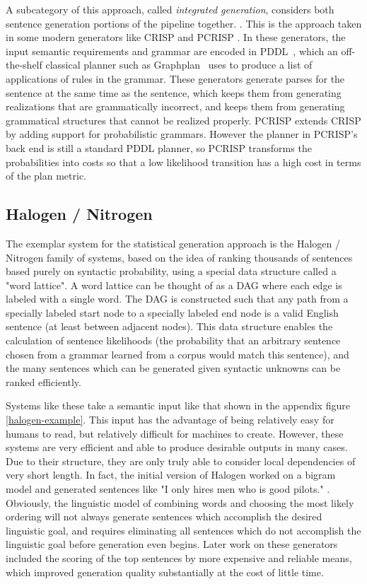 A subcategory of this approach, called {\em integrated generation}, considers both
sentence generation portions of the pipeline together.
\cite{koller_sentence_2007}.  This is the approach taken in some
modern generators like CRISP \cite{koller_sentence_2007} and PCRISP
\cite{bauer_sentence_2010}.  In these generators, the input semantic
requirements and grammar are encoded in PDDL~\cite{fox2003pddl2},
which an off-the-shelf classical planner such as
Graphplan~\cite{blum_1997_graphplan} uses to produce a list of
applications of rules in the grammar.  These generators generate
parses for the sentence at the same time as the sentence, which keeps
them from generating realizations that are grammatically incorrect,
and keeps them from generating grammatical structures that cannot be
realized properly. PCRISP extends CRISP by adding support for
probabilistic grammars. However the planner in PCRISP's back end is
still a standard PDDL planner, so PCRISP transforms the probabilities
into costs so that a low likelihood transition has a high cost in
terms of the plan metric.

\subsection{Halogen / Nitrogen}

The exemplar system for the statistical generation approach is the
Halogen / Nitrogen family of systems, based on the idea of
ranking thousands of sentences based purely on syntactic probability,
using a special data structure called a "word lattice".
A word lattice can be thought of as a DAG where each edge is
labeled with a single word.  The DAG is constructed such that
any path from a specially labeled start node to a specially labeled
end node is a valid English sentence (at least between adjacent nodes).
This data structure enables the calculation of sentence likelihoods
(the probability that an arbitrary sentence chosen from a grammar
learned from a corpus would match this sentence), and the many
sentences which can be generated
given syntactic unknowns can be ranked efficiently.

Systems like these take a semantic input like that shown in
the appendix figure \ref{halogen-example}.  This input
has the advantage of being relatively easy for humans to
read, but relatively difficult for machines to create.
However, these systems are very efficient and able
to produce desirable outputs in many cases.  Due to
their structure, they are only truly able to consider local
dependencies of very short length.  In fact, the
initial version of Halogen worked on a bigram model
and generated sentences like "I only hires men who is good 
pilots." \cite{knight_1995_genselect}.  Obviously, the
linguistic model of combining words and choosing the most likely
ordering will not always generate sentences which accomplish
the desired linguistic goal, and requires eliminating all
sentences which do not accomplish the linguistic goal
before generation even begins.  Later work on these
generators included the scoring of the top
sentences by more expensive and reliable means, which
improved generation quality substantially at the cost of
little time. \cite{langkilde1998generation}

